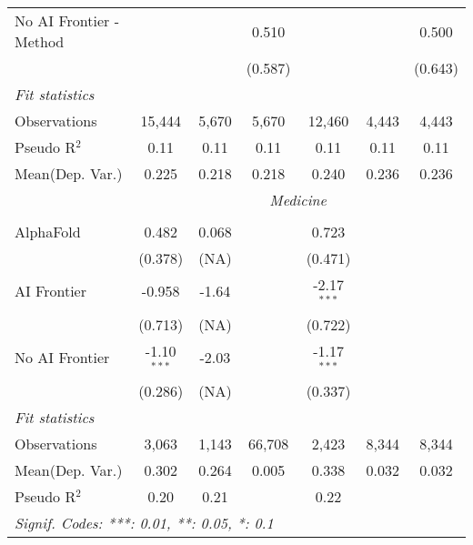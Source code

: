 \begin{tabular}{lcccccc}
   No AI Frontier - Method &               &               & 0.510         &               &             & 0.500\\   
                           &               &               & (0.587)       &               &             & (0.643)\\   
   \midrule
   \emph{Fit statistics}\\
   Observations            & 15,444        & 5,670         & 5,670         & 12,460        & 4,443       & 4,443\\  
   Pseudo R$^2$            & 0.11          & 0.11          & 0.11          & 0.11          & 0.11        & 0.11\\  
   
Mean(Dep. Var.) & 0.225 & 0.218 & 0.218 & 0.240 & 0.236 & 0.236 \\
 & \multicolumn{6}{c}{\textit{Medicine}} \\ \\
   AlphaFold      & 0.482         & 0.068     &        & 0.723         &       &   \\   
                  & (0.378)       & (NA)      &        & (0.471)       &       &   \\   
   AI Frontier    & -0.958        & -1.64     &        & -2.17$^{***}$ &       &   \\   
                  & (0.713)       & (NA)      &        & (0.722)       &       &   \\   
   No AI Frontier & -1.10$^{***}$ & -2.03     &        & -1.17$^{***}$ &       &   \\   
                  & (0.286)       & (NA)      &        & (0.337)       &       &   \\   
   \midrule
   \emph{Fit statistics}\\
   Observations   & 3,063         & 1,143     & 66,708 & 2,423         & 8,344 & 8,344\\  
Mean(Dep. Var.) & 0.302 & 0.264 & 0.005 & 0.338 & 0.032 & 0.032 \\
   Pseudo R$^2$   & 0.20          & 0.21      &        & 0.22          &       & \\  
   \midrule \midrule
   \multicolumn{7}{l}{\emph{Signif. Codes: ***: 0.01, **: 0.05, *: 0.1}}\\
\end{tabular}
\par\endgroup
